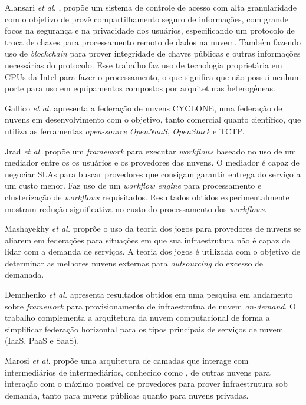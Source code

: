 Alansari \textit{et al.} \cite{ACS_Federation_7980160}, propõe um sistema de controle de acesso com alta granularidade com o objetivo de provê compartilhamento seguro de informações, com grande focos na segurança e na privacidade dos usuários, especificando um protocolo de troca de chaves para processamento remoto de dados na nuvem. Também fazendo uso de \textit{blockchain} para prover integridade de chaves públicas e outras informações necessárias do protocolo. Esse trabalho faz uso de tecnologia proprietária em \acrshort{CPU}s da Intel para fazer o processamento, o que significa que não possui nenhum porte para uso em equipamentos compostos por arquiteturas heterogêneas.

Gallico \textit{et al.} \cite{CYCLONE_7776591} apresenta a federação de nuvens CYCLONE, uma federação de nuvens em desenvolvimento com o objetivo, tanto comercial quanto científico, que utiliza as ferramentas \textit{open-source} \textit{OpenNaaS}\cite{OpenNaaS}, \textit{OpenStack}\cite{OpenStack} e \acrfull{TCTP}\cite{6735419}.

Jrad \textit{et al.} \cite{Jrad:2013:BFM:2462326.2462339} propõe um \textit{framework} para executar \textit{workflows} baseado no uso de um mediador entre os os usuários e os provedores das nuvens. O mediador é capaz de negociar \acrshort{SLA}s para buscar provedores que consigam garantir entrega do serviço a um custo menor. Faz uso de um \textit{workflow engine} para processamento e clusterização de \textit{workflows} requisitados. Resultados obtidos experimentalmente mostram redução significativa no custo do processamento dos \textit{workflows}.

Mashayekhy \textit{et al.} \cite{6853386} proprõe o uso da teoria dos jogos para provedores de nuvens se aliarem em federações para situações em que sua infraestrutura não é capaz de lidar com a demanda de serviços. A teoria dos jogos é utilizada com o objetivo de determinar as melhores nuvens externas para \textit{outsourcing} do excesso de demanada.

Demchenko \textit{et al.} \cite{6427607} apresenta resultados obtidos em uma pesquisa em andamento sobre \textit{framework} para provisionamento de infraestrutua de nuvem \textit{on-demand}. O trabalho complementa a arquitetura da nuvem computacional de forma a simplificar federação horizontal para os tipos principais de serviços de nuvem (\acrshort{IaaS}, \acrshort{PaaS} e \acrshort{SaaS}).

Marosi \textit{et al.} \cite{FCM} propõe uma arquitetura de camadas que interage com intermediários de intermediários, conhecido como \cite{meta-brokering}, de outras nuvens para interação com o máximo possível de provedores para prover infraestrutura sob demanda, tanto para nuvens públicas quanto para nuvens privadas.

